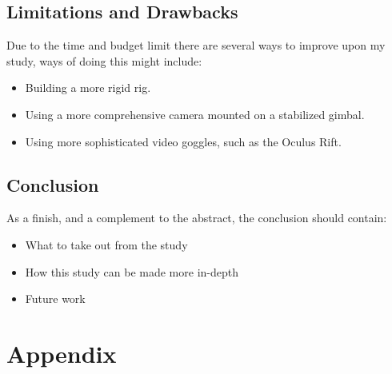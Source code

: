 \documentclass[runningheads,a4paper,oribibl]{llncs}
\begin{document}
\subsection{Limitations and Drawbacks}
Due to the time and budget limit there are several ways to improve upon my study, ways of doing this might include:
\begin{itemize}
	\item Building a more rigid rig.
	\item Using a more comprehensive camera mounted on a stabilized gimbal.
	\item Using more sophisticated video goggles, such as the Oculus Rift.
\end{itemize}




\subsection{Conclusion}
As a finish, and a complement to the abstract, the conclusion should contain:
\begin{itemize}
	\item What to take out from the study
	\item How this study can be made more in-depth
	\item Future work
\end{itemize}






% 



\newpage
\appendix

\section{Appendix}


\end{document}
